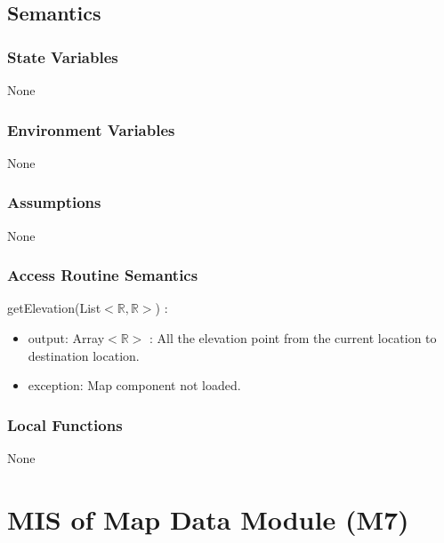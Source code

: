 \documentclass[12pt, titlepage]{article}
\begin{document}
\subsection{Semantics}

\subsubsection{State Variables}

None

\subsubsection{Environment Variables}

None

\subsubsection{Assumptions}

None

\subsubsection{Access Routine Semantics}

\noindent getElevation(List$<\mathbb{R},\mathbb{R}>$) :
\begin{itemize}
\item output: Array$<\mathbb{R}>$ : All the elevation point from the current location to destination location.
\item exception: Map component not loaded.
\end{itemize}

\subsubsection{Local Functions}

None

\newpage



\section{MIS of Map Data Module (M7)} 

\label{Module} 
\end{document}
